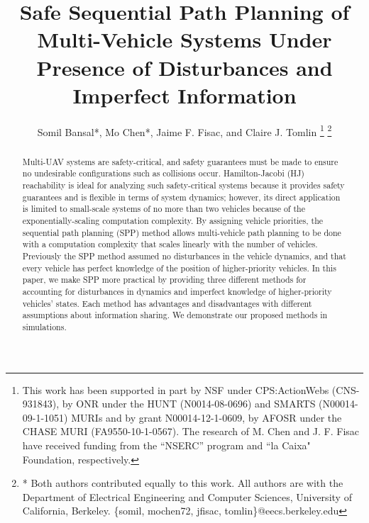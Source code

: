 \documentclass[letterpaper, 10 pt, conference]{ieeeconf}
\title{\LARGE \bf
Safe Sequential Path Planning of Multi-Vehicle Systems Under Presence of Disturbances and Imperfect Information}
\author{Somil Bansal*, Mo Chen*, Jaime F. Fisac, and Claire J. Tomlin
\thanks{This work has been supported in part by NSF under CPS:ActionWebs (CNS-931843), by ONR under the HUNT (N0014-08-0696) and SMARTS (N00014-09-1-1051) MURIs and by grant N00014-12-1-0609, by AFOSR under the CHASE MURI (FA9550-10-1-0567). The research of M. Chen and J. F. Fisac have received funding from the ``NSERC'' program and ``la Caixa" Foundation, respectively.}
\thanks{* Both authors contributed equally to this work. All authors are with the Department of Electrical Engineering and Computer Sciences, University of California, Berkeley. \{somil, mochen72, jfisac, tomlin\}@eecs.berkeley.edu}
}
\begin{document}
\maketitle
\thispagestyle{empty}
\pagestyle{empty}

\begin{abstract}
Multi-UAV systems are safety-critical, and safety guarantees must be made to ensure no undesirable configurations such as collisions occur. Hamilton-Jacobi (HJ) reachability is ideal for analyzing such safety-critical systems because it provides safety guarantees and is flexible in terms of system dynamics; however, its direct application is limited to small-scale systems of no more than two vehicles because of the exponentially-scaling computation complexity. By assigning vehicle priorities, the sequential path planning (SPP) method allows multi-vehicle path planning to be done with a computation complexity that scales linearly with the number of vehicles. Previously the SPP method assumed no disturbances in the vehicle dynamics, and that every vehicle has perfect knowledge of the position of higher-priority vehicles. In this paper, we make SPP more practical by providing three different methods for accounting for disturbances in dynamics and imperfect knowledge of higher-priority vehicles' states. Each method has advantages and disadvantages with different assumptions about information sharing. We demonstrate our proposed methods in simulations.
\end{abstract}












\end{document}
